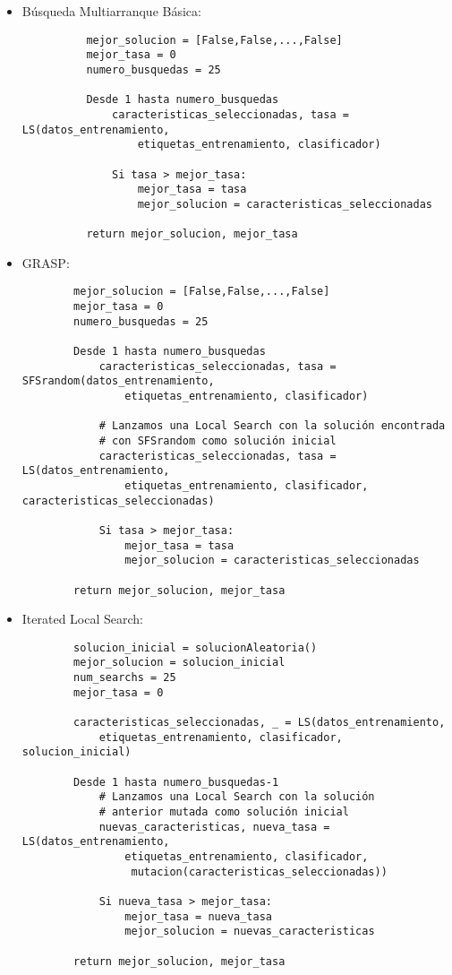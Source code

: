 \documentclass[a4paper, 11pt]{article}
\begin{document}
    \begin{itemize}
      \item Búsqueda Multiarranque Básica:
        \begin{verbatim}
          mejor_solucion = [False,False,...,False]
          mejor_tasa = 0
          numero_busquedas = 25

          Desde 1 hasta numero_busquedas
              caracteristicas_seleccionadas, tasa = LS(datos_entrenamiento,
                  etiquetas_entrenamiento, clasificador)

              Si tasa > mejor_tasa:
                  mejor_tasa = tasa
                  mejor_solucion = caracteristicas_seleccionadas

          return mejor_solucion, mejor_tasa
        \end{verbatim}
      \item GRASP:
      \begin{verbatim}
        mejor_solucion = [False,False,...,False]
        mejor_tasa = 0
        numero_busquedas = 25

        Desde 1 hasta numero_busquedas
            caracteristicas_seleccionadas, tasa = SFSrandom(datos_entrenamiento,
                etiquetas_entrenamiento, clasificador)

            # Lanzamos una Local Search con la solución encontrada
            # con SFSrandom como solución inicial
            caracteristicas_seleccionadas, tasa = LS(datos_entrenamiento,
                etiquetas_entrenamiento, clasificador, caracteristicas_seleccionadas)

            Si tasa > mejor_tasa:
                mejor_tasa = tasa
                mejor_solucion = caracteristicas_seleccionadas

        return mejor_solucion, mejor_tasa
      \end{verbatim}
      \item Iterated Local Search:
      \begin{verbatim}
        solucion_inicial = solucionAleatoria()
        mejor_solucion = solucion_inicial
        num_searchs = 25
        mejor_tasa = 0

        caracteristicas_seleccionadas, _ = LS(datos_entrenamiento,
            etiquetas_entrenamiento, clasificador, solucion_inicial)

        Desde 1 hasta numero_busquedas-1
            # Lanzamos una Local Search con la solución
            # anterior mutada como solución inicial
            nuevas_caracteristicas, nueva_tasa = LS(datos_entrenamiento,
                etiquetas_entrenamiento, clasificador,
                 mutacion(caracteristicas_seleccionadas))

            Si nueva_tasa > mejor_tasa:
                mejor_tasa = nueva_tasa
                mejor_solucion = nuevas_caracteristicas

        return mejor_solucion, mejor_tasa
      \end{verbatim}
    \end{itemize}
\end{document}
